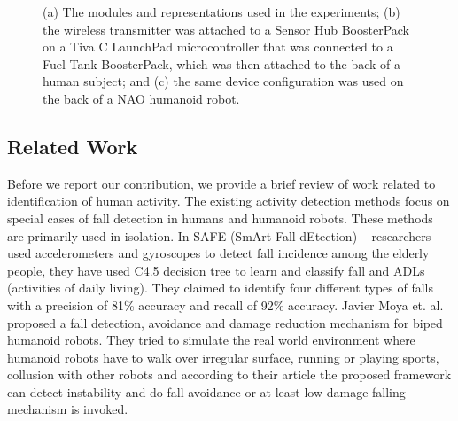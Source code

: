 \documentclass[letterpaper]{article}
\begin{document}
\begin{figure}[!t]
\centering
{}
\caption{(a) The modules and representations used in the experiments;  (b) the wireless transmitter 
was attached to a Sensor Hub BoosterPack on a Tiva C LaunchPad microcontroller that was connected to 
a Fuel Tank BoosterPack, which was then attached to the back of a human subject; and (c) the same 
device configuration was used on the back of a NAO humanoid robot.}
 \label{fig:framework}
\end{figure}


\subsection{Related Work}

Before we report our contribution, we provide a brief review of work related to identification of 
human activity. 
The existing activity detection methods focus on special cases of fall detection in humans and 
humanoid robots. These methods are primarily used in isolation.  
In SAFE (SmArt Fall dEtection) {~\cite{ojetola2011fall}} researchers used accelerometers and 
gyroscopes 
to detect fall incidence among the elderly people, they have used C4.5 decision tree to learn and 
classify fall and ADLs (activities of daily living). They claimed to identify four different types 
of falls with a precision of 81\% accuracy and recall of 92\% accuracy.
Javier Moya et. al.{~\cite{moya2014fall}} proposed a fall detection, avoidance and damage reduction 
mechanism for biped humanoid robots. They tried to simulate the real world environment where 
humanoid robots have to walk over irregular surface, running or playing sports, collusion with 
other 
robots and according to their article the proposed framework can detect instability and do fall 
avoidance or at least low-damage falling mechanism is invoked. 
\end{document}
